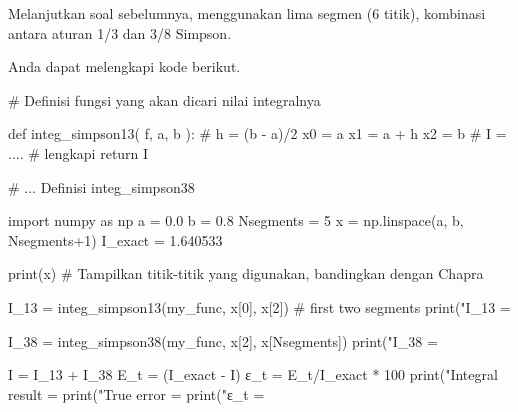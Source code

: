 \begin{soal}
Melanjutkan soal sebelumnya, menggunakan lima segmen (6 titik),
kombinasi antara aturan 1/3 dan 3/8 Simpson.
\end{soal}

Anda dapat melengkapi kode berikut.
\begin{pythoncode}
# Definisi fungsi yang akan dicari nilai integralnya

def integ_simpson13( f, a, b ):
    #
    h = (b - a)/2
    x0 = a
    x1 = a + h
    x2 = b
    #
    I = .... # lengkapi
    return I
    
# ... Definisi integ_simpson38
    
import numpy as np
a = 0.0
b = 0.8
Nsegments = 5
x = np.linspace(a, b, Nsegments+1)
I_exact = 1.640533

print(x)
# Tampilkan titik-titik yang digunakan, bandingkan dengan Chapra
    
I_13 = integ_simpson13(my_func, x[0], x[2]) # first two segments
print("I_13 = %
    
I_38 = integ_simpson38(my_func, x[2], x[Nsegments])
print("I_38 = %
    
I = I_13 + I_38
E_t = (I_exact - I)
ε_t = E_t/I_exact * 100
print("Integral result = %
print("True error      = %
print("ε_t             = %
\end{pythoncode}